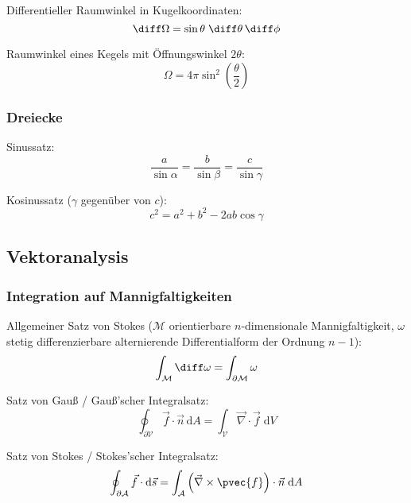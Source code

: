 \documentclass[11pt]{article}
\numberwithin{equation}{section}
\begin{document}
        Differentieller Raumwinkel in Kugelkoordinaten:
        \begin{equation}
          \diff \Omega = \sin\theta\;\diff \theta \,\diff \phi
        \end{equation}

        Raumwinkel eines Kegels mit Öffnungswinkel $2\theta$:
        \begin{equation}
          \Omega = 4\pi\sin^2\left(\frac{\theta}{2}\right)
        \end{equation}

      \subsubsection{Dreiecke}
        Sinussatz:
        \begin{equation}
          \frac{a}{\sin\alpha} = \frac{b}{\sin\beta} = \frac{c}{\sin\gamma}
        \end{equation}

        Kosinussatz ($\gamma$ gegenüber von $c$):
        \begin{equation}
          c^2 = a^2 + b^2 -2ab \cos\gamma
        \end{equation}


		\subsection{Vektoranalysis}
      \subsubsection{Integration auf Mannigfaltigkeiten}
        Allgemeiner Satz von Stokes ($\mathcal{M}$ orientierbare $n$-dimensionale Mannigfaltigkeit, $\omega$ stetig differenzierbare alternierende Differentialform der Ordnung $n-1$):
        \begin{equation}
          \int_\mathcal{M} \diff \omega = \int_{\partial\mathcal{M}} \omega
        \end{equation}

        Satz von Gauß / Gauß'scher Integralsatz:
        \begin{equation}
          \oint_{\partial\mathcal{V}}\vec{f}\cdot\vec{n}\,\mathrm{d}A=\int_{\mathcal{V}}\vec{\nabla}\cdot\vec{f}\;\mathrm{d}V
        \end{equation}

        Satz von Stokes / Stokes'scher Integralsatz:
        \begin{equation}
          \oint_{\partial\mathcal{A}}\vec{f}\cdot\mathrm{d}\vec{s}=\int_{\mathcal{A}}\left(\vec{\nabla}\times\pvec{f}\right)\cdot\vec{n}\;\mathrm{d}A
        \end{equation}
\end{document}
